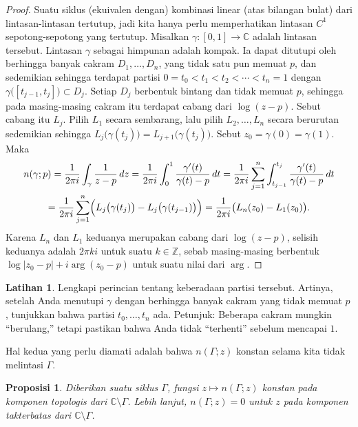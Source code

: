\documentclass[12pt,openany]{book}
\newcommand{\sabs}[1]{\lvert {#1} \rvert}
\newcommand{\C}{{\mathbb{C}}}
\newcommand{\Z}{{\mathbb{Z}}}
\newcommand{\myquote}[1]{``#1''}
\theoremstyle{plain}
\newtheorem{prop}[thm]{Proposisi}
\theoremstyle{remark}
\theoremstyle{definition}
\newenvironment{exbox}{%
    \def\FrameCommand{\vrule width 1pt \relax\hspace{10pt}}%
    \MakeFramed{\advance\hsize-\width\FrameRestore}%
}{%
    \endMakeFramed
}
\theoremstyle{exercise}
\newtheorem{exercise}{Latihan}[section]
\theoremstyle{example}
\begin{document}
\begin{proof}
Suatu siklus (ekuivalen dengan) kombinasi linear (atas bilangan bulat) dari lintasan-lintasan tertutup,
jadi kita hanya perlu memperhatikan lintasan $C^1$ sepotong-sepotong yang tertutup.
Misalkan $\gamma \colon [0,1] \to \C$ adalah lintasan tersebut.
Lintasan $\gamma$ sebagai himpunan adalah kompak.  Ia dapat ditutupi oleh berhingga banyak
cakram $D_1,\ldots,D_n$, yang tidak satu pun memuat $p$, dan sedemikian sehingga terdapat
partisi $0 = t_0 < t_1 < t_2 < \cdots < t_n = 1$ dengan
$\gamma\bigl([t_{j-1},t_j]\bigr) \subset D_j$.  Setiap $D_j$ berbentuk bintang dan
tidak memuat $p$,
sehingga pada masing-masing cakram itu terdapat cabang dari $\log (z-p)$.  Sebut cabang itu $L_j$.
Pilih $L_1$ secara sembarang, lalu pilih $L_2,\ldots,L_n$ secara berurutan
sedemikian sehingga
$L_j\bigl(\gamma(t_j)\bigr) = L_{j+1}\bigl(\gamma(t_j)\bigr)$.
Sebut $z_0 = \gamma(0) = \gamma(1)$.  Maka
\begin{multline*}
n(\gamma;p)
=
\frac{1}{2\pi i} \int_\gamma \frac{1}{z-p} \, dz
=
\frac{1}{2\pi i} \int_0^1 \frac{\gamma'(t)}{\gamma(t)-p} \, dt
=
\frac{1}{2\pi i} \sum_{j=1}^n \int_{t_{j-1}}^{t_j} \frac{\gamma'(t)}{\gamma(t)-p} \, dt
\\
=
\frac{1}{2\pi i} \sum_{j=1}^n
\Bigl(
L_j\bigl(\gamma(t_j)\bigr) -
L_j\bigl(\gamma(t_{j-1})\bigr)
\Bigr)
=
\frac{1}{2\pi i} \bigl( L_n(z_0) - L_1(z_0) \bigr) .
\end{multline*}
Karena $L_n$ dan $L_1$ keduanya merupakan cabang dari $\log(z-p)$, selisih keduanya adalah
$2\pi k i$ untuk suatu $k \in \Z$, sebab masing-masing berbentuk
$\log\sabs{z_0-p} + i \arg (z_0-p)$ untuk suatu nilai dari
$\arg$.
\end{proof}

\begin{exbox}
\begin{exercise}
Lengkapi perincian tentang keberadaan partisi tersebut.  Artinya, setelah Anda
menutupi $\gamma$ dengan berhingga banyak cakram yang tidak memuat $p$, tunjukkan bahwa
partisi $t_0,\ldots,t_n$ ada.  Petunjuk: Beberapa cakram mungkin
\myquote{berulang,} tetapi pastikan bahwa Anda tidak \myquote{terhenti}
sebelum mencapai $1$.
\end{exercise}
\end{exbox}

Hal kedua yang perlu diamati adalah bahwa $n(\Gamma;z)$ konstan selama kita
tidak melintasi $\Gamma$.

\begin{prop} \label{prop:windingconstant}
Diberikan suatu siklus $\Gamma$,
fungsi $z \mapsto n(\Gamma;z)$ konstan pada
komponen topologis dari $\C \setminus \Gamma$.
Lebih lanjut, $n(\Gamma;z) = 0$ untuk $z$ pada komponen takterbatas
dari $\C \setminus \Gamma$.
\end{prop}
\end{document}
